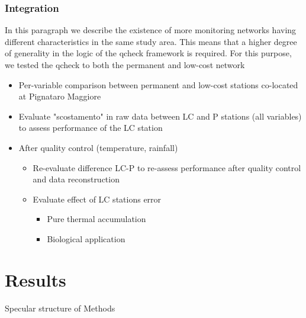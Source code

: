 \documentclass[authoryear,preprint,review,12pt]{elsarticle}
\begin{document}
\subsubsection{Integration}\label{Integration}
In this paragraph we describe the existence of more monitoring networks having different characteristics in the same study area.
This means that a higher degree of generality in the logic of the qcheck framework is required.
For this purpose, we tested the qcheck to both the permanent and low-cost network
\begin{itemize}
    \item Per-variable comparison between permanent and low-cost stations co-located at Pignataro Maggiore
    \item Evaluate "scostamento" in raw data between LC and P stations (all variables) to assess performance of the LC station
    \item After quality control (temperature, rainfall)
    \begin{itemize}
        \item Re-evaluate difference LC-P to re-assess performance after quality control and data reconstruction 
        \item Evaluate effect of LC stations error
        \begin{itemize}
            \item Pure thermal accumulation
            \item Biological application
        \end{itemize}
    \end{itemize}
\end{itemize}


\section{Results}
Specular structure of Methods
\end{document}

